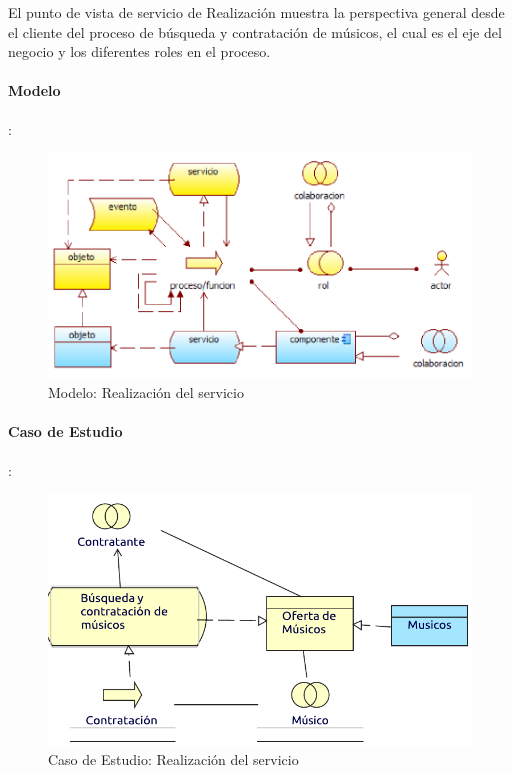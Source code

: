 El punto de vista de servicio de Realización muestra la perspectiva general desde el cliente del proceso de búsqueda y contratación de músicos, el cual es el eje del negocio y los diferentes roles en el proceso.

\paragraph{Modelo}:
\begin{figure}[h!]
	\centering
	\includegraphics[width=\linewidth]{Desarrollo/ArquitecturaEmpresarial/Tecnologia/imgs/realizacionMetamodelo.PNG}
	\caption{Modelo: Realización del servicio}
\end{figure}
\newpage
\paragraph{Caso de Estudio}:

\begin{figure}[hbt!]
	\centering
	\includegraphics[width=\linewidth]{Desarrollo/ArquitecturaEmpresarial/Tecnologia/imgs/realizacion.pdf}
	\caption{Caso de Estudio: Realización del servicio}
\end{figure}

